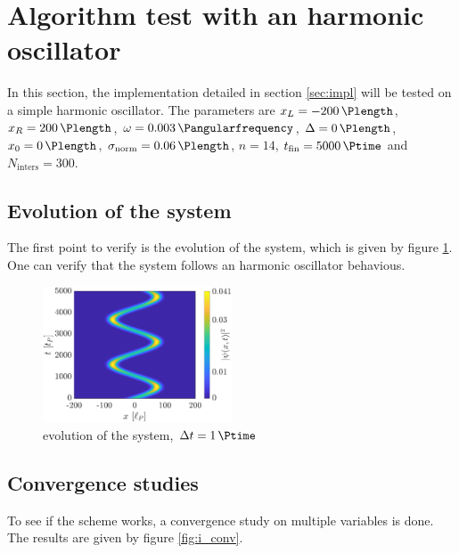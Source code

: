 \documentclass[a4paper,12pt,twoside]{article}
\begin{document}


\newpage
\section{Algorithm test with an harmonic oscillator}\label{sec:har_osc}
  In this section, the implementation detailed in section \ref{sec:impl} will be tested on a simple harmonic oscillator.
  The parameters are $x_L=\SI{-200}{\Plength}$, $x_R=\SI{200}{\Plength}$, $\omega = \SI{0.003}{\Pangularfrequency}$, $\Delta = \SI{0}{\Plength}$, $x_0 = \SI{0}{\Plength}$, $\sigma_\text{norm} = \SI{0.06}{\Plength}$, $n=14$, $t_\text{fin} = \SI{5000}{\Ptime}$ and $N_\text{inters} = 300$.


  \subsection{Evolution of the system}
  The first point to verify is the evolution of the system, which is given by figure \ref{fig:i_evo}.
  One can verify that the system follows an harmonic oscillator behavious.

  \begin{figure}[h]
    \centering
    \includegraphics[width=0.5\textwidth]{graphs/i_evo.eps}
    \caption{evolution of the system, $\Delta t = \SI{1}{\Ptime}$}
    \label{fig:i_evo}
  \end{figure}

  \subsection{Convergence studies}
    To see if the scheme works, a convergence study on multiple variables is done.
    The results are given by figure \ref{fig:i_conv}.
\end{document}
